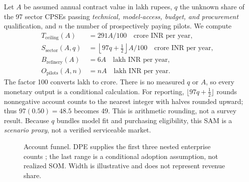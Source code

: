 \documentclass[11pt,a4paper]{article}
\begin{document}
Let \(A\) be assumed annual contract value in lakh rupees, \(q\) the unknown share of the 97 sector CPSEs passing \emph{technical, model-access, budget, and procurement} qualification, and \(n\) the number of prospectively paying pilots. We compute
\begin{align}
T_{\mathrm{ceiling}}(A) &= 291A/100 \quad\text{crore INR per year}, \label{eq:tam}\\
S_{\mathrm{sector}}(A,q) &= \left\lfloor97q+\tfrac12\right\rfloor A/100
   \quad\text{crore INR per year},\label{eq:sam}\\
B_{\mathrm{refinery}}(A) &= 6A \quad\text{lakh INR per year},\\
O_{\mathrm{pilots}}(A,n) &= nA \quad\text{lakh INR per year}. \label{eq:som}
\end{align}
The factor 100 converts lakh to crore. There is no measured \(q\) or \(A\), so every monetary output is a conditional calculation. For reporting, \(\lfloor97q+\tfrac12\rfloor\) rounds nonnegative account counts to the nearest integer with halves rounded upward; thus \(97(0.50)=48.5\) becomes 49. This is arithmetic rounding, not a survey result. Because \(q\) bundles model fit and purchasing eligibility, this SAM is a \emph{scenario proxy}, not a verified serviceable market.

\begin{figure}[htbp]
\centering
{}
\caption{Account funnel. DPE supplies the first three nested enterprise counts \cite{dpe2025,dpeappendix}; the last range is a conditional adoption assumption, not realized SOM. Width is illustrative and does not represent revenue share.}
\label{fig:funnel}
\end{figure}
\end{document}
